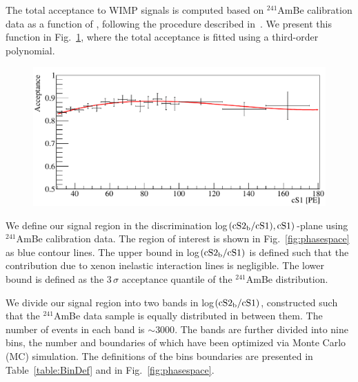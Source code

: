The total acceptance to WIMP signals is computed based on $^{241}$AmBe calibration data as a function of \cSi, following the procedure described in~\cite{Aprile:2012vw}. We present this function in Fig.~\ref{fig:Acc}, where the total acceptance is fitted using a third-order polynomial.

\begin{figure}[t!]
\begin{minipage}{0.9\linewidth}
\centerline{\includegraphics[width=1.\linewidth]{fig/Acceptance.pdf}}
\end{minipage}
\label{fig:Acc}
\end{figure}

We define our signal region in the discrimination log$(\mathrm{cS2}_\mathrm{b}{}/\mathrm{cS1}),\mathrm{cS1})$-plane using $^{241}$AmBe calibration data. 
The region of interest is shown in Fig.~\ref{fig:phasespace} as blue contour lines. The upper bound in log$(\mathrm{cS2}_\mathrm{b}/\mathrm{cS1})$ is defined such that the contribution due to xenon inelastic interaction lines is negligible. The lower bound is defined as the 3\,$\sigma$ acceptance quantile of the $^{241}$AmBe distribution.

We divide our signal region into two bands in log$(\mathrm{cS2}_\mathrm{b}/\mathrm{cS1})$, constructed such that the $^{241}$AmBe data sample is equally distributed in between them. The number of events in each band is $\sim3000$. The bands are further divided into nine bins, the number and boundaries of which have been optimized via Monte Carlo (MC) simulation. The definitions of the bins boundaries are presented in Table~\ref{table:BinDef} and in Fig.~\ref{fig:phasespace}. 

